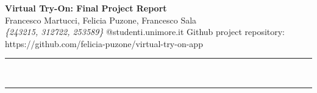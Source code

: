 \documentclass[a4paper,12pt]{article}
\renewenvironment{abstract}
 {\par\noindent\textbf{\abstractname}\ \ignorespaces \\}
 {\par\noindent\medskip}
\begin{document}
\pagestyle{fancy}
\thispagestyle{empty}
\fancyhead[L]{}

\renewcommand*{\thefootnote}{\fnsymbol{footnote}}

\begin{center}
\Large{\textbf{Virtual Try-On: Final Project Report}} 
\vspace{0.4cm}
\normalsize
\\ Francesco Martucci, Felicia Puzone, Francesco Sala \\
\vspace{0.1cm}
\textit{\{243215, 312722, 253589\}}
\small{@studenti.unimore.it}
Github project repository: https://github.com/felicia-puzone/virtual-try-on-app\\
\medskip
\normalsize
\end{center}

{\color{gray}\hrule}
\vspace{0.4cm}
\begin{abstract}

\end{abstract}

\setlength{\textwidth}{200pt}

{\color{gray}\hrule}
\medskip



\newpage




\end{document}
